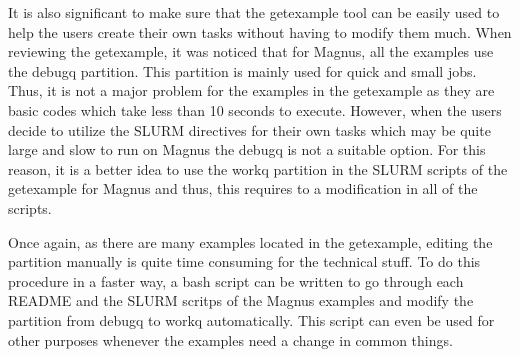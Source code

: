 It is also significant to make sure that the getexample tool can be easily used to help the users create their own tasks without having to modify them
much. When reviewing the getexample, it was noticed that for Magnus, all the examples use the debugq partition. This partition is mainly used
for quick and small jobs. Thus, it is not a major problem for the examples in the getexample as they are basic codes which take less than 10 seconds 
to execute. However, when the users decide to utilize the SLURM directives for their own tasks which may be quite large and slow to run on Magnus the 
debugq is not a suitable option. For this reason, it is a better idea to use the workq partition in the SLURM scripts of the getexample for Magnus and
thus, this requires to a modification in all of the scripts.

Once again, as there are many examples located in the getexample, editing the partition manually is quite time consuming for the technical stuff. To do 
this procedure in a faster way, a bash script can be written to go through each README and the SLURM scritps of the Magnus examples and modify the 
partition from debugq to workq automatically. This script can even be used for other purposes whenever the examples need a change in common things.   
